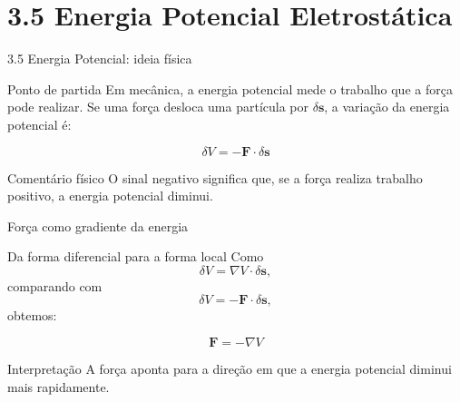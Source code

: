 \documentclass[aspectratio=169,11pt]{beamer}
\begin{document}
\section{3.5 Energia Potencial Eletrostática}

\begin{frame}{3.5 Energia Potencial: ideia física}

\begin{mybox}{Ponto de partida}
Em mecânica, a energia potencial mede o trabalho que a força pode realizar.
Se uma força desloca uma partícula por \(\delta \mathbf{s}\), a variação da energia potencial é:
\end{mybox}

\begin{eqbox}
\begin{equation}
\delta V = -\mathbf F \cdot \delta \mathbf s
\tag{3.61}
\end{equation}
\end{eqbox}

\begin{alertblock}{Comentário físico}
O sinal negativo significa que, se a força realiza trabalho positivo, a energia potencial diminui.
\end{alertblock}

\end{frame}


\begin{frame}{Força como gradiente da energia}

\begin{mybox}{Da forma diferencial para a forma local}
Como
\[
\delta V = \nabla V \cdot \delta \mathbf{s},
\]
comparando com
\[
\delta V = -\mathbf F \cdot \delta \mathbf{s},
\]
obtemos:
\end{mybox}

\begin{eqbox}
\begin{equation}
\mathbf F = -\nabla V
\tag{3.62}
\end{equation}
\end{eqbox}

\begin{alertblock}{Interpretação}
A força aponta para a direção em que a energia potencial diminui mais rapidamente.
\end{alertblock}

\end{frame}
\end{document}

